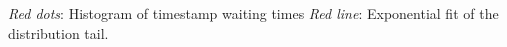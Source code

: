 \textit{Red dots}: Histogram of timestamp waiting times
\textit{Red line}: Exponential fit of the distribution tail.
\label{fig:bgdist}